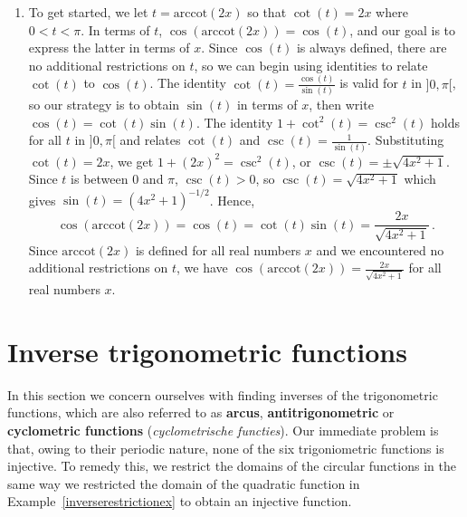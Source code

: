 \begin{example}
\begin{enumerate}
		\item  To get started, we let $t = \mbox{arccot}(2x)$ so that  $\cot(t) = 2x$ where $0 < t < \pi$.  In terms of $t$, $\cos(\mbox{arccot}(2x)) = \cos(t)$, and our goal is to express the latter in terms of $x$.   Since $\cos(t)$ is always defined, there are no additional restrictions on $t$, so we can begin using identities to relate $\cot(t)$ to $\cos(t)$.  The identity $\cot(t) = \frac{\cos(t)}{\sin(t)}$ is valid for $t$ in $]0,\pi[$, so our strategy is to obtain $\sin(t)$ in terms of $x$, then write $\cos(t) = \cot(t) \sin(t)$.   The identity $1 + \cot^{2}(t) = \csc^{2}(t)$ holds for all $t$ in $]0,\pi[$ and relates $\cot(t)$ and $\csc(t) = \frac{1}{\sin(t)}$.  Substituting $\cot(t) =2x$, we get  $1 + (2x)^2 = \csc^{2}(t)$, or $\csc(t) =  \pm \sqrt{4x^2+1}$. Since $t$ is between $0$ and $\pi$, $\csc(t) > 0$, so $\csc(t) =\sqrt{4x^2+1}$ which gives $\sin(t) = \left(4x^2+1\right)^{-1/2}$. Hence, 
		$$
		\cos(\mbox{arccot}(2x)) = \cos(t) = \cot(t) \sin(t) = \frac{2x}{\sqrt{4x^2+1}}\,.
		$$
		Since $\mbox{arccot}(2x)$ is defined for all real numbers $x$ and we encountered no additional restrictions on $t$, we have  $\cos\left(\mbox{arccot}(2x)\right) = \frac{2x}{\sqrt{4x^2+1}}$ for all real numbers $x$. 
		
	\end{enumerate}
\end{example}
\fi


\ifvc

\section{Inverse trigonometric functions}
\label{sec_inverse_trig}
In this section we concern ourselves with finding inverses of the trigonometric functions, which are also referred to as \textbf{arcus}, \textbf{antitrigonometric} or \textbf{cyclometric functions} (\textit{cyclometrische functies}).  Our immediate problem is that, owing to their periodic nature, none of the six trigoniometric functions is  injective. To remedy this, we restrict the domains of the circular functions in the same way we restricted the domain of the quadratic function in Example~\ref{inverserestrictionex} to obtain an injective function. 

